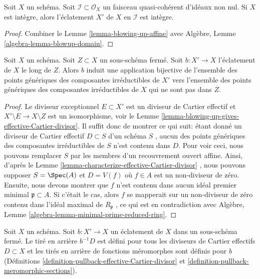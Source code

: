 \begin{lemma}
\label{lemma-blow-up-integral-scheme}
Soit  $X$  un schéma. Soit  $\mathcal{I} \subset \mathcal{O}_X$  un faisceau quasi-cohérent d'idéaux
non nul. Si  $X$  est intègre, alors l'éclatement  $X'$  de  $X$ 
en  $\mathcal{I}$  est intègre.
\end{lemma}

\begin{proof}
Combiner le Lemme  \ref{lemma-blowing-up-affine}  avec Algèbre, Lemme  \ref{algebra-lemma-blowup-domain}.
\end{proof}

\begin{lemma}
\label{lemma-blow-up-and-irreducible-components}
Soit  $X$  un schéma. Soit  $Z \subset X$  un sous-schéma fermé. Soit
 $b : X' \to X$  l'éclatement de  $X$  le long de  $Z$. Alors  $b$ 
induit une application bijective de l'ensemble des points génériques des
composantes irréductibles de  $X'$  vers l'ensemble des points génériques
des composantes irréductibles de  $X$  qui ne sont pas dans  $Z$.
\end{lemma}

\begin{proof}
Le diviseur exceptionnel  $E \subset X'$  est un diviseur de Cartier effectif et
 $X' \setminus E \to X \setminus Z$  est un isomorphisme, voir le Lemme  \ref{lemma-blowing-up-gives-effective-Cartier-divisor}. Il suffit donc de
montrer ce qui suit: étant donné un diviseur de Cartier effectif  $D \subset S$  d'un
schéma  $S$ , aucun des points génériques des composantes irréductibles de
 $S$  n'est contenu dans  $D$. Pour voir ceci, nous pouvons
remplacer  $S$  par les membres d'un recouvrement ouvert affine. Ainsi,
d'après le Lemme  \ref{lemma-characterize-effective-Cartier-divisor} , nous pouvons supposer  $S = \Spec(A)$  et  $D = V(f)$ 
où  $f \in A$  est un non-diviseur de zéro. Ensuite, nous devons montrer que
 $f$  n'est contenu dans aucun idéal premier minimal  $\mathfrak p \subset A$. Si
c'était le cas, alors  $f$  se mapperait sur un non-diviseur de zéro
contenu dans l'idéal maximal de  $R_\mathfrak p$ , ce qui est en contradiction avec
Algèbre, Lemme  \ref{algebra-lemma-minimal-prime-reduced-ring}.
\end{proof}

\begin{lemma}
\label{lemma-blow-up-pullback-effective-Cartier}
Soit  $X$  un schéma. Soit  $b : X' \to X$  un éclatement de  $X$  dans
un sous-schéma fermé. Le tiré en arrière  $b^{-1}D$  est défini pour tous les
diviseurs de Cartier effectifs  $D \subset X$  et les tirés en arrière de fonctions
méromorphes sont définis pour  $b$  (Définitions  \ref{definition-pullback-effective-Cartier-divisor}  et
 \ref{definition-pullback-meromorphic-sections}).
\end{lemma}

